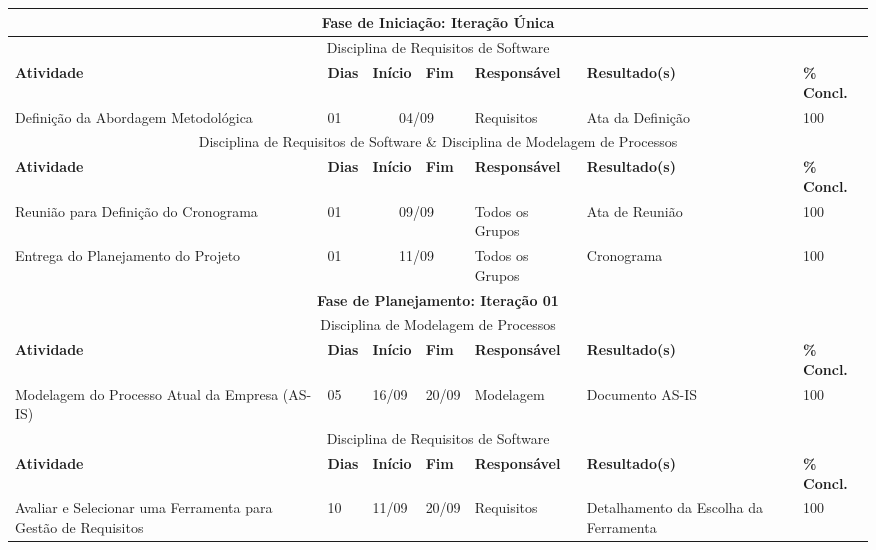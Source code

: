 \begin{center}
	\begin{tabular}{|m{6cm}|m{1cm}|m{1cm}|m{1cm}|m{4cm}|m{6cm}|m{2cm}|}
	\hline
	\multicolumn{7}{|c|}{\textbf{Fase de Iniciação: Iteração Única}} \\
	\hline
	\multicolumn{7}{|c|}{Disciplina de Requisitos de Software} \\
	\hline
	\textbf{Atividade} & \textbf{Dias} & \textbf{Início} & \textbf{Fim} & \textbf{Responsável} & \textbf{Resultado(s)} & \textbf{\% Concl.} \\ \hline 
	Definição da Abordagem Metodológica & 01 & \multicolumn{2}{c|}{04/09} & Requisitos & Ata da Definição & 100 \\ \hline
	\multicolumn{7}{|c|}{Disciplina de Requisitos de Software \& Disciplina de Modelagem de Processos} \\
	\hline
	\textbf{Atividade} & \textbf{Dias} & \textbf{Início} & \textbf{Fim} & \textbf{Responsável} & \textbf{Resultado(s)} & \textbf{\% Concl.} \\ \hline 
	Reunião para Definição do Cronograma & 01 & \multicolumn{2}{c|}{09/09} & Todos os Grupos & Ata de Reunião & 100 \\ \hline
	Entrega do Planejamento do Projeto & 01 & \multicolumn{2}{c|}{11/09} & Todos os Grupos & Cronograma & 100 \\ \hline
	\multicolumn{7}{|c|}{\textbf{Fase de Planejamento: Iteração 01}} \\
	\hline
	\multicolumn{7}{|c|}{Disciplina de Modelagem de Processos} \\
	\hline
	\textbf{Atividade} & \textbf{Dias} & \textbf{Início} & \textbf{Fim} & \textbf{Responsável} & \textbf{Resultado(s)} & \textbf{\% Concl.} \\ \hline
	Modelagem do Processo Atual da Empresa (AS-IS) & 05 & 16/09 & 20/09 & Modelagem & Documento AS-IS & 100 \\ \hline
	\multicolumn{7}{|c|}{Disciplina de Requisitos de Software} \\
	\hline
	\textbf{Atividade} & \textbf{Dias} & \textbf{Início} & \textbf{Fim} & \textbf{Responsável} & \textbf{Resultado(s)} & \textbf{\% Concl.} \\ \hline
	Avaliar e Selecionar uma Ferramenta para Gestão de Requisitos & 10 & 11/09 & 20/09 & Requisitos & Detalhamento da Escolha da Ferramenta & 100 \\ \hline
	\end{tabular}
\end{center}
